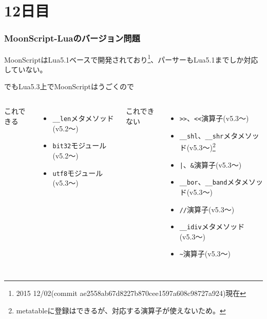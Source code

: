 \section{12日目}
\begin{frame}[fragile]
	\frametitle{MoonScript-Luaのバージョン問題}
	MoonScriptはLua5.1ベースで開発されており\footnote[frame]{2015 12/02(commit ae2558ab67d8227b870cee1597a608c98727a924)現在}、パーサーもLua5.1までしか対応していない。

	でもLua5.3上でMoonScriptはうごくので\vspace{2\zw}

	\begin{columns}
		\scriptsize
		\newcommand{\lv}[1]{{\tiny{}(v{#1}〜)}}
		\column[t]{.5\hsize}
		\alert{これできる}
		\begin{itemize}
			\item \lstinline|__len|メタメソッド\lv{5.2}
			\item \lstinline|bit32|モジュール\lv{5.2}
			\item \lstinline|utf8|モジュール\lv{5.3}
		\end{itemize}
		\column[t]{.5\hsize}
		\alert{これできない}
		\begin{itemize}
			\item \lstinline|>>|、\lstinline|<<|演算子\lv{5.3}
			\item \lstinline|__shl|、\lstinline|__shr|メタメソッド\lv{5.3}\footnote[frame]{metatableに登録はできるが、対応する演算子が使えないため。}
			\item \lstinline;|;、\lstinline|&|演算子\lv{5.3}
			\item \lstinline|__bor|、\lstinline|__band|メタメソッド\lv{5.3}\footnotemark[10]
			\item \lstinline|//|演算子\lv{5.3}
			\item \lstinline|__idiv|メタメソッド\lv{5.3}\footnotemark[10]
			\item \lstinline|~|演算子\lv{5.3}
		\end{itemize}
	\end{columns}
\end{frame}
